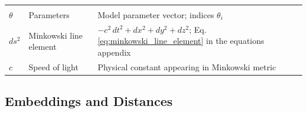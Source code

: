 \documentclass[
  10pt,
]{article}
\begin{document}
\begin{longtable}[]{@{}lll@{}}
\begin{minipage}[t]{0.30\columnwidth}
\end{minipage}\tabularnewline
\begin{minipage}[t]{0.30\columnwidth}\raggedright
\(\theta\)\strut
\end{minipage} & \begin{minipage}[t]{0.30\columnwidth}\raggedright
Parameters\strut
\end{minipage} & \begin{minipage}[t]{0.30\columnwidth}\raggedright
Model parameter vector; indices \(\theta_i\)\strut
\end{minipage}\tabularnewline
\begin{minipage}[t]{0.30\columnwidth}\raggedright
\(ds^2\)\strut
\end{minipage} & \begin{minipage}[t]{0.30\columnwidth}\raggedright
Minkowski line element\strut
\end{minipage} & \begin{minipage}[t]{0.30\columnwidth}\raggedright
\(-c^2\,dt^2 + dx^2 + dy^2 + dz^2\); Eq.
\eqref{eq:minkowski_line_element} in the equations appendix\strut
\end{minipage}\tabularnewline
\begin{minipage}[t]{0.30\columnwidth}\raggedright
\(c\)\strut
\end{minipage} & \begin{minipage}[t]{0.30\columnwidth}\raggedright
Speed of light\strut
\end{minipage} & \begin{minipage}[t]{0.30\columnwidth}\raggedright
Physical constant appearing in Minkowski metric\strut
\end{minipage}\tabularnewline
\bottomrule
\end{longtable}

\hypertarget{embeddings-and-distances}{%
\subsection{Embeddings and Distances}\label{embeddings-and-distances}}
\end{document}
